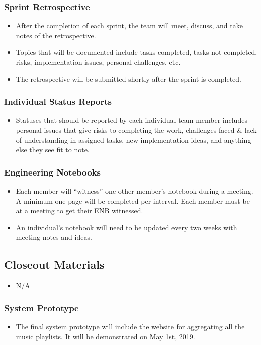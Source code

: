 \subsubsection{Sprint Retrospective}
\begin{itemize}
  \item After the completion of each sprint, the team will meet, discuss, and take notes of the retrospective.
  \item Topics that will be documented include tasks completed, tasks not completed, risks, implementation issues, personal challenges, etc.
  \item The retrospective will be submitted shortly after the sprint is completed.
\end{itemize}

\subsubsection{Individual Status Reports}
\begin{itemize}
  \item Statuses that should be reported by each individual team member includes personal issues that give risks to completing the work, challenges faced & lack of understanding in assigned tasks, new implementation ideas, and anything else they see fit to note.
\end{itemize}

\subsubsection{Engineering Notebooks}
\begin{itemize}
  \item Each member will “witness” one other member’s notebook during a meeting. A minimum one page will be completed per interval. Each member must be at a meeting to get their ENB witnessed.
  \item An individual’s notebook will need to be updated every two weeks with meeting notes and ideas.
\end{itemize}

\subsection{Closeout Materials}
\begin{itemize}
  \item N/A
\end{itemize}

\subsubsection{System Prototype}
\begin{itemize}
  \item The final system prototype will include the website for aggregating all the music playlists. It will be demonstrated on May 1st, 2019.
\end{itemize}

